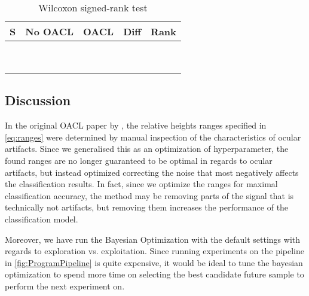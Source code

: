 \begin{table}[H]
	\centering
	\caption{Wilcoxon signed-rank test}
	\label{fig:wilcoxon}
	\begin{tabular}{@{}l|llll@{}}
		\toprule
		S & No OACL & OACL & Diff & Rank \\ \midrule
		&               &                 &      &      \\
		&               &                 &      &      \\
		&               &                 &      &      \\
		&               &                 &      &      \\
		&               &                 &      &      \\
		&               &                 &      &      \\
		&               &                 &      &      \\
		&               &                 &      &      \\
		&               &                 &      &      \\ \bottomrule
	\end{tabular}
\end{table}

\subsection{Discussion}\label{sec:discussion}
In the original OACL paper by \citep{li2015ocular}, the relative heights ranges specified in \cref{eq:ranges} were determined by manual inspection of the characteristics of ocular artifacts. Since we generalised this as an optimization of hyperparameter, the found ranges are no longer guaranteed to be optimal in regards to ocular artifacts, but instead optimized correcting the noise that most negatively affects the classification results. In fact, since we optimize the ranges for maximal classification accuracy, the method may be removing parts of the signal that is technically not artifacts, but removing them increases the performance of the classification model.

Moreover, we have run the Bayesian Optimization with the default settings with regards to exploration vs. exploitation. Since running experiments on the pipeline in \cref{fig:ProgramPipeline} is quite expensive, it would be ideal to tune the bayesian optimization to spend more time on selecting the best candidate future sample to perform the next experiment on. 

